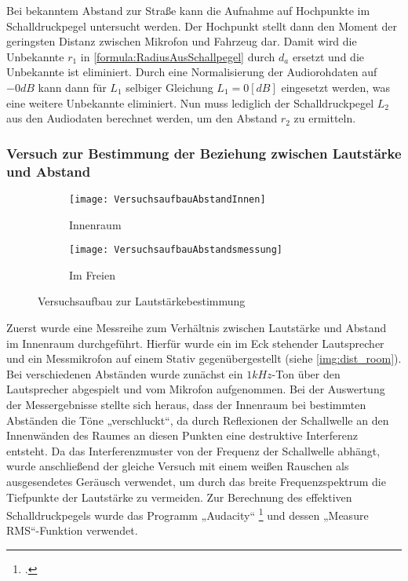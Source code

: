 Bei bekanntem Abstand zur Straße kann die Aufnahme auf Hochpunkte im Schalldruckpegel untersucht werden. Der Hochpunkt stellt dann den Moment der geringsten Distanz zwischen Mikrofon und Fahrzeug dar. Damit wird die Unbekannte \(r_{1}\) in \autoref{formula:RadiusAusSchallpegel} durch \(d_{a}\) ersetzt und die Unbekannte ist eliminiert. Durch eine Normalisierung der Audiorohdaten auf \(-0 dB\) kann dann für \(L_{1}\) selbiger Gleichung \(L_{1} = 0 [dB]\) eingesetzt werden, was eine weitere Unbekannte eliminiert. Nun muss lediglich der Schalldruckpegel \(L_{2}\) aus den Audiodaten berechnet werden, um den Abstand \(r_{2}\) zu ermitteln.


\subsubsection{Versuch zur Bestimmung der Beziehung zwischen Lautstärke und Abstand}

\begin{figure}[h]
    \begin{subfigure}{.5\textwidth}
        \centering
        \texttt{[image: VersuchsaufbauAbstandInnen]}
        \caption{Innenraum}
        \label{img:dist_room}
    \end{subfigure}
    \begin{subfigure}{.5\textwidth}
        \centering
        \texttt{[image: VersuchsaufbauAbstandsmessung]}
        \caption{Im Freien}
        \label{img:dist_free_field}
    \end{subfigure}
    \caption{Versuchsaufbau zur Lautstärkebestimmung}
    \label{img:versuche_abstand}
\end{figure}

Zuerst wurde eine Messreihe zum Verhältnis zwischen Lautstärke und Abstand im Innenraum durchgeführt. Hierfür wurde ein im Eck stehender Lautsprecher und ein Messmikrofon auf einem Stativ gegenübergestellt (siehe \autoref{img:dist_room}). Bei verschiedenen Abständen wurde zunächst ein \(1 kHz\)-Ton über den Lautsprecher abgespielt und vom Mikrofon aufgenommen. Bei der Auswertung der Messergebnisse stellte sich heraus, dass der Innenraum bei bestimmten Abständen die Töne „verschluckt“, da durch Reflexionen der Schallwelle an den Innenwänden des Raumes an diesen Punkten eine destruktive Interferenz entsteht. Da das Interferenzmuster von der Frequenz der Schallwelle abhängt, wurde anschließend der gleiche Versuch mit einem weißen Rauschen als ausgesendetes Geräusch verwendet, um durch das breite Frequenzspektrum die Tiefpunkte der Lautstärke zu vermeiden. Zur Berechnung des effektiven Schalldruckpegels wurde das Programm „Audacity“ \footcite{Audacity} und dessen „Measure RMS“-Funktion verwendet.

